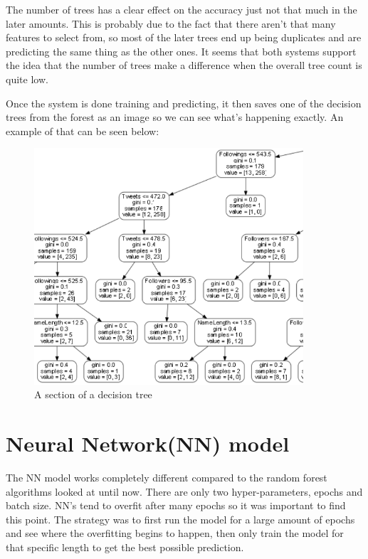 The number of trees has a clear effect on the accuracy just not that much in the later amounts. This is probably due to the fact that there aren't that many features to select from, so most of the later trees end up being duplicates and are predicting the same thing as the other ones. It seems that both systems support the idea that the number of trees make a difference when the overall tree count is quite low. 

Once the system is done training and predicting, it then saves one of the decision trees from the forest as an image so we can see what's happening exactly. An example of that can be seen below:
\begin{figure}[!h]
\centering
\includegraphics[width=100mm]{figures/decisiontree}
\caption{A section of a decision tree}
\end{figure}

\newpage
\section{Neural Network(NN) model}
The NN model works completely different compared to the random forest algorithms looked at until now. There are only two hyper-parameters, epochs and batch size. NN's tend to overfit after many epochs so it was important to find this point. The strategy was to first run the model for a large amount of epochs and see where the overfitting begins to happen, then only train the model for that specific length to get the best possible prediction.

\newpage

